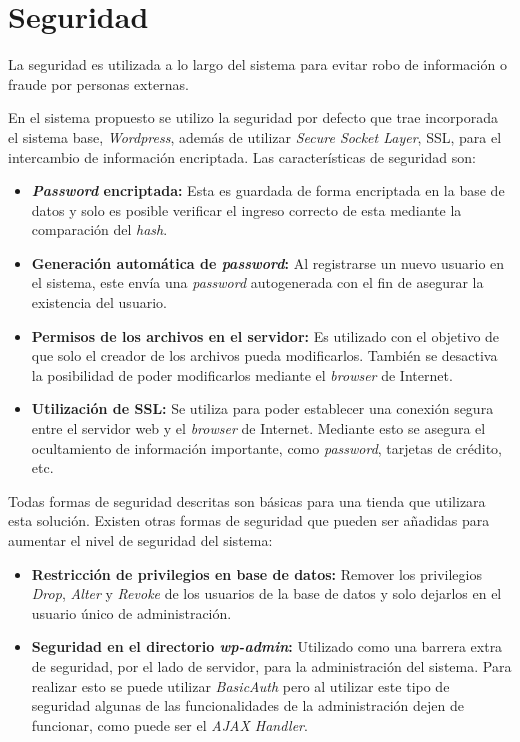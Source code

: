 \section{Seguridad}

La seguridad es utilizada a lo largo del sistema para evitar robo de información o 
fraude por personas externas. 

En el sistema propuesto se utilizo la seguridad por defecto que trae incorporada
el sistema base, \emph{Wordpress}, además de utilizar \emph{Secure Socket Layer}, SSL, para el
 intercambio de información encriptada. Las características de seguridad son:

\begin{itemize}

\item {\bf \emph{Password} encriptada:} Esta es guardada de forma encriptada en la base de datos y solo es 
	posible verificar el ingreso correcto de esta mediante la comparación del \emph{hash}.
\item {\bf Generación automática de \emph{password}:} Al registrarse un nuevo usuario en el sistema, este 
	envía una \emph{password} autogenerada con el fin de asegurar la existencia del usuario.
\item {\bf Permisos de los archivos en el servidor:} Es utilizado con el objetivo de que solo el creador
	de los archivos pueda modificarlos. También se desactiva la posibilidad de poder modificarlos
	mediante el \emph{browser} de Internet.
\item {\bf Utilización de SSL:} Se utiliza para poder establecer una conexión segura entre el servidor web
	y el \emph{browser} de Internet. Mediante esto se asegura el ocultamiento de información
	importante, como \emph{password}, tarjetas de crédito, etc. 
\end{itemize}  

Todas formas  de seguridad descritas son básicas para una tienda que utilizara esta solución. Existen 
otras formas de seguridad que pueden ser añadidas para aumentar el nivel de seguridad del sistema:

\begin{itemize}

\item {\bf Restricción de privilegios en base de datos:} Remover los privilegios \emph{Drop}, 
\emph{Alter} y \emph{Revoke} de los usuarios de la base de datos y solo dejarlos en el usuario
único de administración.

\item {\bf Seguridad en el directorio \emph{wp-admin}:} Utilizado como una barrera extra de seguridad,
por el lado de servidor, para la administración del sistema. Para realizar esto se puede utilizar 
\emph{BasicAuth} pero al utilizar este tipo de seguridad algunas de las funcionalidades de la 
administración dejen de funcionar, como puede ser el \emph{AJAX Handler}.

\end{itemize}

